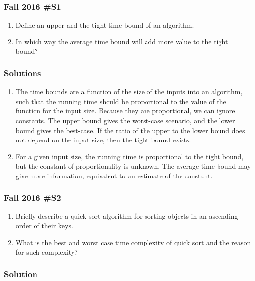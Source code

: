 \subsubsection{Fall 2016 \#S1}
	\begin{enumerate}
		\item Define an upper and the tight time bound of an algorithm.
		\item In which way the average time bound will add more value to the tight bound?
	\end{enumerate}
	
\subsubsection{Solutions}

\begin{enumerate}
	\item The time bounds are a function of the size of the inputs into an algorithm, such that the running time should be proportional to the value of the function for the input size.  Because they are proportional, we can ignore constants.  The upper bound gives the worst-case scenario, and the lower bound gives the best-case.  If the ratio of the upper to the lower bound does not depend on the input size, then the tight bound exists.  
	\item For a given input size, the running time is proportional to the tight bound, but the constant of proportionality is unknown.  The average time bound may give more information, equivalent to an estimate of the constant.  
\end{enumerate}
	
\subsubsection{Fall 2016 \#S2}
	\begin{enumerate}
		\item Briefly describe a quick sort algorithm for sorting objects in an ascending order of their keys.
		\item What is the best and worst case time complexity of quick sort and the reason for such complexity?
	\end{enumerate}
	
\subsubsection{Solution}

